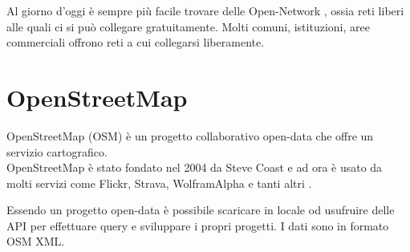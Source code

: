 \documentclass[12pt,a4paper,openright,twoside]{report}
\begin{document}
Al giorno d'oggi è sempre più facile trovare delle Open-Network \cite{K12}, ossia reti liberi alle quali ci si può collegare gratuitamente. Molti comuni, istituzioni, aree commerciali offrono reti a cui collegarsi liberamente.



\section{OpenStreetMap}
OpenStreetMap (OSM) \cite{K13} è un progetto collaborativo open-data che offre un servizio cartografico.\\
OpenStreetMap è stato fondato nel 2004 da Steve Coast e ad ora è usato da molti servizi come Flickr, Strava, WolframAlpha e tanti altri \cite{K14}.

Essendo un progetto open-data è possibile scaricare in locale od usufruire delle API per effettuare query e sviluppare i propri progetti. I dati sono in formato OSM XML.
\end{document}
